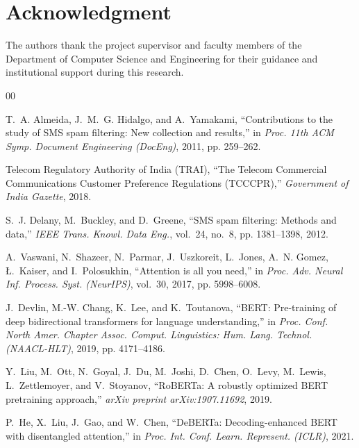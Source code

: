 \documentclass[conference]{IEEEtran}
\begin{document}
\section*{Acknowledgment}
The authors thank the project supervisor and faculty members of the Department of Computer Science and Engineering for their guidance and institutional support during this research.

\begin{thebibliography}{00}

T.~A. Almeida, J.~M.~G. Hidalgo, and A.~Yamakami, ``Contributions to the study of SMS spam filtering: New collection and results,'' in \emph{Proc. 11th ACM Symp. Document Engineering (DocEng)}, 2011, pp. 259--262.

Telecom Regulatory Authority of India (TRAI), ``The Telecom Commercial Communications Customer Preference Regulations (TCCCPR),'' \emph{Government of India Gazette}, 2018.

S.~J. Delany, M.~Buckley, and D.~Greene, ``SMS spam filtering: Methods and data,'' \emph{IEEE Trans. Knowl. Data Eng.}, vol.~24, no.~8, pp. 1381--1398, 2012.

A.~Vaswani, N.~Shazeer, N.~Parmar, J.~Uszkoreit, L.~Jones, A.~N. Gomez, {\L}.~Kaiser, and I.~Polosukhin, ``Attention is all you need,'' in \emph{Proc. Adv. Neural Inf. Process. Syst. (NeurIPS)}, vol.~30, 2017, pp. 5998--6008.

J.~Devlin, M.-W. Chang, K.~Lee, and K.~Toutanova, ``BERT: Pre-training of deep bidirectional transformers for language understanding,'' in \emph{Proc. Conf. North Amer. Chapter Assoc. Comput. Linguistics: Hum. Lang. Technol. (NAACL-HLT)}, 2019, pp. 4171--4186.

Y.~Liu, M.~Ott, N.~Goyal, J.~Du, M.~Joshi, D.~Chen, O.~Levy, M.~Lewis, L.~Zettlemoyer, and V.~Stoyanov, ``RoBERTa: A robustly optimized BERT pretraining approach,'' \emph{arXiv preprint arXiv:1907.11692}, 2019.

P.~He, X.~Liu, J.~Gao, and W.~Chen, ``DeBERTa: Decoding-enhanced BERT with disentangled attention,'' in \emph{Proc. Int. Conf. Learn. Represent. (ICLR)}, 2021.


\end{thebibliography}
\end{document}
